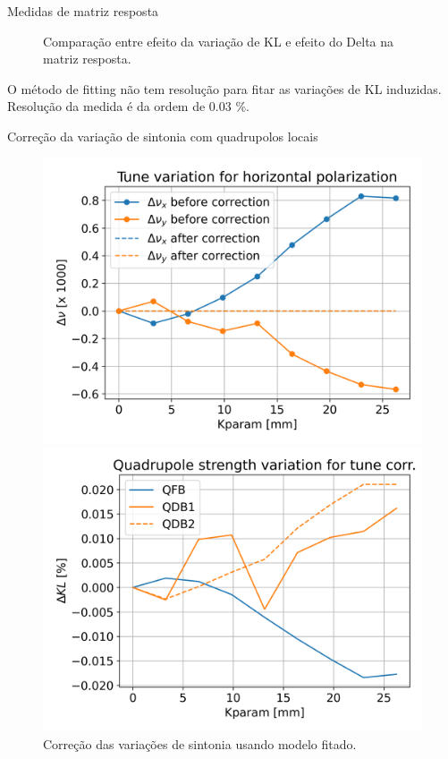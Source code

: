\documentclass[1611]{beamer}            %
\begin{document}
\begin{frame}{Medidas de matriz resposta}
\begin{figure}[ht]
\begin{minipage}[b]{0.45\linewidth}
            \caption{Comparação entre efeito da variação de KL e efeito do Delta na matriz resposta.}
            \label{fig:b}
        \end{minipage}
   \end{figure}
O método de fitting não tem resolução para fitar as variações de KL induzidas. Resolução da medida é da ordem de 0.03 \%.
\end{frame}

\begin{frame}{Correção da variação de sintonia com quadrupolos locais}
    \begin{figure}[ht]
        \begin{minipage}[b]{0.45\linewidth}
            \centering
            \includegraphics[width=\textwidth]{2024-05-10/figures/tune_corr_model.png}
            \caption{Correção das variações de sintonia usando modelo fitado.}
            \label{fig:a}
        \end{minipage}
        \hspace{0.5cm}
        \begin{minipage}[b]{0.45\linewidth}
            \centering
            \includegraphics[width=\textwidth]{2024-05-10/figures/Quad_stg.png}

\end{minipage}
\end{figure}
\end{frame}
\end{document}
